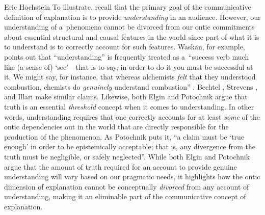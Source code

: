 \begin{artengenv}{Eric Hochstein}
To illustrate, recall that the primary goal of the communicative definition of explanation is to provide \textit{understanding} in an audience. However, our understanding of a~phenomena cannot be divorced from our ontic commitments about essential structural and causal features in the world since part of what it is to understand is to correctly account for such features. Waskan, for example, points out that ``understanding'' is frequently treated as a~``success verb much like (a sense of) ‘see'---that is to say, in order to do it you must be successful at it. We might say, for instance, that whereas alchemists \textit{felt} that they understood combustion, chemists do \textit{genuinely} understand combustion''
\parencite[][emphasis in the text]{waskan_intelligibility_2011}. %
 Bechtel 
\parencite*[][p.14]{bechtel_mental_2008}, %
 Strevens 
\parencite*[][p.3]{strevens_depth_2011}, %
 and Illari 
\parencite*[][p.245]{illari_mechanistic_2013} %
 make similar claims. Likewise, both Elgin 
\parencite*[][]{elgin_true_2004} %
 and Potochnik 
\parencite*[][]{potochnik_diverse_2015} %
 argue that truth is an essential \textit{threshold} concept when it comes to understanding. In other words, understanding requires that one correctly accounts for at least \textit{some} of the ontic dependencies out in the world that are directly responsible for the production of the phenomenon. As Potochnik 
\parencite*[][p.73]{potochnik_diverse_2015} %
 puts it, ``a claim must be ‘true enough' in order to be epistemically acceptable; that is, any divergence from the truth must be negligible, or safely neglected''. While both Elgin and Potochnik argue that the amount of truth required for an account to provide genuine understanding will vary based on our pragmatic needs, it highlights how the ontic dimension of explanation cannot be conceptually \textit{divorced} from any account of understanding, making it an eliminable part of the communicative concept of explanation.


\end{artengenv}
